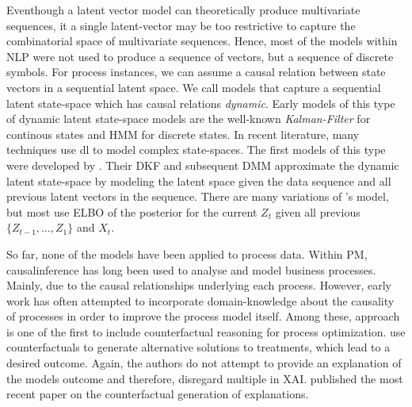 \documentclass[12pt,a4paper]{report}
\begin{document}
Eventhough a latent vector model can theoretically produce multivariate sequences, it a single latent-vector may be too restrictive to capture the combinatorial space of multivariate sequences. Hence, most of the models within \gls{NLP} were not used to produce a sequence of vectors, but a sequence of discrete symbols. For process instances, we can assume a causal relation between state vectors in a sequential latent space. We call models that capture a sequential latent state-space which has causal relations \emph{dynamic}\autocite{leglaive_RecurrentVariationalAutoencoder_2020}. Early models of this type of dynamic latent state-space models are the well-known \emph{Kalman-Filter} for continous states and \gls{HMM} for discrete states. In recent literature, many techniques use \gls{dl} to model complex state-spaces. The first models of this type were developed by \citeauthor{krishnan_StructuredInferenceNetworks_2017}. Their \gls{DKF} and subsequent \gls{DMM} approximate the dynamic latent state-space by modeling the latent space given the data sequence and all previous latent vectors in the sequence. There are many variations of \citeauthor{krishnan_StructuredInferenceNetworks_2017}'s model, but most use \gls{ELBO} of the posterior for the current $Z_{t}$ given all previous $\{Z_{t-1},\ldots,Z_{1}\}$ and $X_{t}$. 

So far, none of the models have been applied to process data. Within \gls{PM}, \gls{causalinference} has long been used to analyse and model business processes. Mainly, due to the causal relationships underlying each process. However, early work has often attempted to incorporate domain-knowledge about the causality of processes in order to improve the process model itself\autocites{shook_AssessmentUseStructural_2004,baker_ClosingLoopEmpirical_2017,hompes_DiscoveringCausalFactors_2017,wang_CounterfactualDataAugmentedSequential_2021}. 
Among these, \citeauthor{narendra_CounterfactualReasoningProcess_2019} approach is one of the first to include counterfactual reasoning for process optimization.
\citeauthor{oberst_CounterfactualOffPolicyEvaluation_2019} use counterfactuals to generate alternative solutions to treatments, which lead to a desired outcome.
Again, the authors do not attempt to provide an explanation of the models outcome and therefore, disregard multiple  in \gls{XAI}. \autocite{qafari_CaseLevelCounterfactual_2021} published the most recent paper on the counterfactual generation of explanations.  
\end{document}
